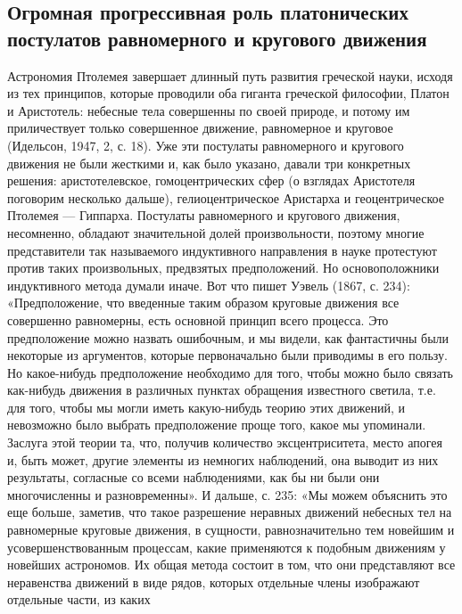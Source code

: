 \subsection{Огромная   прогрессивная  роль   платонических  постулатов
равномерного и кругового движения}

Астрономия Птолемея  завершает длинный путь развития  греческой науки,
исходя  из  тех принципов,  которые  проводили  оба гиганта  греческой
философии,  Платон и  Аристотель:  небесные тела  совершенны по  своей
природе,  и  потому  им  приличествует  только  совершенное  движение,
равномерное  и   круговое  (Идельсон,  1947,   2,  с.  18).   Уже  эти
постулаты  равномерного  и  кругового  движения не  были  жесткими  и,
как  было указано,  давали  три  конкретных решения:  аристотелевское,
гомоцентрических  сфер  (о  взглядах  Аристотеля  поговорим  несколько
дальше),  гелиоцентрическое   Аристарха  и   геоцентрическое  Птолемея
---   Гиппарха.   Постулаты   равномерного   и   кругового   движения,
несомненно, обладают значительной долей произвольности, поэтому многие
представители  так   называемого  индуктивного  направления   в  науке
протестуют  против таких  произвольных,  предвзятых предположений.  Но
основоположники индуктивного метода думали иначе. Вот что пишет Уэвель
(1867, с.  234): «Предположение, что введенные  таким образом круговые
движения  все  совершенно  равномерны,  есть  основной  принцип  всего
процесса. Это предположение можно назвать  ошибочным, и мы видели, как
фантастичны были  некоторые из аргументов, которые  первоначально были
приводимы в  его пользу. Но какое-нибудь  предположение необходимо для
того,  чтобы  можно  было  связать  как-нибудь  движения  в  различных
пунктах обращения  известного светила, т.е.  для того, чтобы  мы могли
иметь  какую-нибудь теорию  этих движений,  и невозможно  было выбрать
предположение проще того, какое мы  упоминали. Заслуга этой теории та,
что, получив  количество эксцентриситета, место апогея  и, быть может,
другие элементы из немногих наблюдений, она выводит из них результаты,
согласные со  всеми наблюдениями, как  бы ни были они  многочисленны и
разновременны».  И  дальше,  с.  235:  «Мы  можем  объяснить  это  еще
больше,  заметив,  что  такое разрешение  неравных  движений  небесных
тел  на равномерные  круговые движения,  в сущности,  равнозначительно
тем  новейшим и  усовершенствованным  процессам,  какие применяются  к
подобным  движениям у  новейших  астрономов. Их  общая метода  состоит
в  том,  что   они  представляют  все  неравенства   движений  в  виде
рядов, которых  отдельные члены  изображают отдельные части,  из каких
